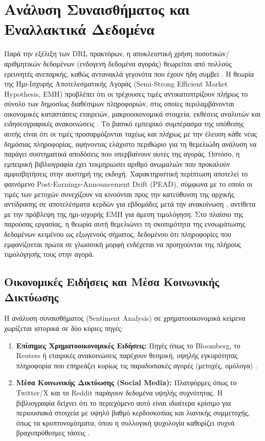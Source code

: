 \section{Ανάλυση Συναισθήματος και Εναλλακτικά Δεδομένα}
Παρά την εξέλιξη των DRL πρακτόρων, η αποκλειστική χρήση ποσοτικών/αριθμητικών δεδομένων 
(ενδογενή δεδομένα αγοράς) θεωρείται από πολλούς ερευνητές ανεπαρκής, καθώς αντανακλά γεγονότα 
που έχουν ήδη συμβεί \cite{tetlock2007, benhenda2025finrldeepseek}. Η θεωρία της Ημι-Ισχυρής 
Αποτελεσματικής Αγοράς (Semi-Strong Efficient Market Hypothesis, EMH) προβλέπει ότι οι τρέχουσες 
τιμές αντικατοπτρίζουν πλήρως το σύνολο των δημοσίως διαθέσιμων πληροφοριών, στις οποίες 
περιλαμβάνονται οικονομικές καταστάσεις εταιρειών, μακροοικονομικά στοιχεία, εκθέσεις αναλυτών 
και ειδησεογραφικές ανακοινώσεις 
\cite{fama1970emh, fama1969adjustment, malkiel2003efficient, brilhante2024efficient}. 
Το βασικό εμπειρικό συμπέρασμα της υπόθεσης αυτής είναι ότι οι τιμές προσαρμόζονται ταχέως και 
πλήρως με την έλευση κάθε νέας δημόσιας πληροφορίας, αφήνοντας ελάχιστο περιθώριο για τη θεμελιώδη 
ανάλυση να παράγει συστηματικά αποδόσεις που υπερβαίνουν αυτές της αγοράς. Ωστόσο, η εμπειρική 
βιβλιογραφία έχει τεκμηριώσει αριθμό ανωμαλιών που προκαλούν αμφισβητήσεις στην αυστηρή της εκδοχή. 
Χαρακτηριστική περίπτωση αποτελεί το φαινόμενο Post-Earnings-Announcement Drift (PEAD), 
σύμφωνα με το οποίο οι τιμές των μετοχών συνεχίζουν να κινούνται προς την κατεύθυνση της αρχικής 
αντίδρασης σε αποτελέσματα κερδών για εβδομάδες μετά την ανακοίνωση \cite{bernard1989pead}, 
αντίθετα με την πρόβλεψη της ημι-ισχυρής EMH για άμεση τιμολόγηση. Στο πλαίσιο της παρούσας εργασίας, 
η θεωρία αυτή θεμελιώνει τη σκοπιμότητα της ενσωμάτωσης δεδομένων κειμένου ως εξωγενούς σήματος, 
δεδομένου ότι πληροφορίες που εμφανίζονται πρώτα σε γλωσσική μορφή ενδέχεται να προηγούνται της 
πλήρους τιμολόγησής τους στην αγορά.

\subsection{Οικονομικές Ειδήσεις και Μέσα Κοινωνικής Δικτύωσης}
Η ανάλυση συναισθήματος (Sentiment Analysis) σε χρηματοοικονομικά κείμενα χωρίζεται ιστορικά 
σε δύο κύριες πηγές:
\begin{enumerate}
    \item \textbf{Επίσημες Χρηματοοικονομικές Ειδήσεις:} Πηγές όπως το Bloomberg, το Reuters 
    ή εταιρικές ανακοινώσεις παρέχουν θεσμική, υψηλής εγκυρότητας πληροφορία που επηρεάζει 
    κυρίως τις παραδοσιακές αγορές (μετοχές, ομόλογα) \cite{tetlock2007}.
    \item \textbf{Μέσα Κοινωνικής Δικτύωσης (Social Media):} Πλατφόρμες όπως το Twitter/X 
    και το Reddit παράγουν δεδομένα υψηλής συχνότητας. Η βιβλιογραφία δείχνει ότι το περιεχόμενο 
    αυτό είναι ιδιαίτερα κρίσιμο για περιουσιακά στοιχεία με υψηλό βαθμό κερδοσκοπίας και λιανικής 
    συμμετοχής, όπως τα κρυπτονομίσματα, όπου η συλλογική ψυχολογία καθορίζει συχνά βραχυπρόθεσμες 
    τάσεις \cite{bollen2011twitter, kraaijeveld2020twitter}.
\end{enumerate}

